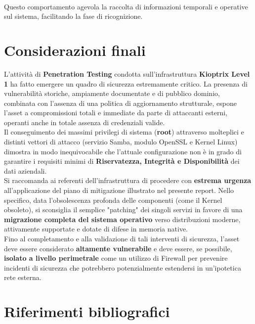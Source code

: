 \documentclass[12pt, a4paper]{article}
\begin{document}
	\vspace{0.2 cm}
	 \\\vspace{0.2 cm}
	Questo comportamento agevola la raccolta di informazioni temporali e operative sul sistema, facilitando la fase di ricognizione.









	\newpage
	\section{Considerazioni finali}

	L'attività di \textbf{Penetration Testing} condotta sull'infrastruttura \textbf{Kioptrix Level 1} ha fatto emergere un quadro di sicurezza estremamente critico. La presenza di vulnerabilità storiche, ampiamente documentate e di pubblico dominio, combinata con l'assenza di una politica di aggiornamento strutturale, espone l'asset a compromissioni totali e immediate da parte di attaccanti esterni, operanti anche in totale assenza di credenziali valide.\\
	Il conseguimento dei massimi privilegi di sistema (\textbf{root}) attraverso molteplici e distinti vettori di attacco (servizio Samba, modulo OpenSSL e Kernel Linux) dimostra in modo inequivocabile che l'attuale configurazione non è in grado di garantire i requisiti minimi di \textbf{Riservatezza, Integrità e Disponibilità} dei dati aziendali.\\
	Si raccomanda ai referenti dell'infrastruttura di procedere con \textbf{estrema urgenza} all'applicazione del piano di mitigazione illustrato nel presente report. Nello specifico, data l'obsolescenza profonda delle componenti (come il Kernel obsoleto), si sconsiglia il semplice "patching" dei singoli servizi in favore di una \textbf{migrazione completa del sistema operativo} verso distribuzioni moderne, attivamente supportate e dotate di difese in memoria native.\\
	Fino al completamento e alla validazione di tali interventi di sicurezza, l'asset deve essere considerato \textbf{altamente vulnerabile} e deve essere, se possibile, \textbf{isolato a livello perimetrale} come un utilizzo di Firewall per prevenire incidenti di sicurezza che potrebbero potenzialmente estendersi in un'ipotetica rete esterna.

	\newpage
	\section{Riferimenti bibliografici}
\end{document}
